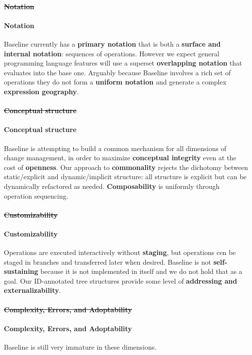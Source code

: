 \documentclass[english,submission]{programming}
\theoremstyle{definition}
\newcommand{\myparagraph}[1]{\vspace{-8pt}\paragraph{#1}} %
\providecommand{\DIFdel}[1]{{\protect\color{red}\sout{#1}}} %
\providecommand{\DIFaddbegin}{} %
\providecommand{\DIFaddend}{} %
\providecommand{\DIFdelbegin}{} %
\providecommand{\DIFdelend}{} %
\begin{document}
\DIFdelbegin \paragraph{\DIFdel{Notation}} %
\addtocounter{paragraph}{-1}%
\DIFdelend \DIFaddbegin \myparagraph{Notation} \DIFaddend Baseline currently has a \textbf{primary notation} that is both a \textbf{surface and internal notation}: sequences of operations. However we expect general programming language features will use a superset \textbf{overlapping notation} that evaluates into the base one. Arguably because Baseline involves a rich set of operations they do not form a \textbf{uniform notation} and generate a complex \textbf{expression geography}.

\DIFdelbegin \paragraph{\DIFdel{Conceptual structure}} %
\addtocounter{paragraph}{-1}%
\DIFdelend \DIFaddbegin \myparagraph{Conceptual structure} \DIFaddend Baseline is attempting to build a common mechanism for all dimensions of change management, in order to maximize \textbf{conceptual integrity} even at the cost of \textbf{openness}. Our approach to \textbf{commonality} rejects the  dichotomy between static/explicit and dynamic/implicit structure: all structure is explicit but can be dynamically refactored as needed. \textbf{Composability} is uniformly through operation sequencing.

\DIFdelbegin \paragraph{\DIFdel{Customizability}} %
\addtocounter{paragraph}{-1}%
\DIFdelend \DIFaddbegin \myparagraph{Customizability} \DIFaddend Operations are executed interactively without \textbf{staging}, but operations cen be staged in branches and transferred later when desired. Baseline is not \textbf{self-sustaining} because it is not implemented in itself and we do not hold that as a goal. Our ID-annotated tree structures provide some level of \textbf{addressing and externalizability}.

\DIFdelbegin \paragraph{\DIFdel{Complexity, Errors, and Adoptability}} %
\addtocounter{paragraph}{-1}%
\DIFdelend \DIFaddbegin \myparagraph{Complexity, Errors, and Adoptability} \DIFaddend Baseline is still very immature in these dimensions.





\printbibliography
\end{document}
